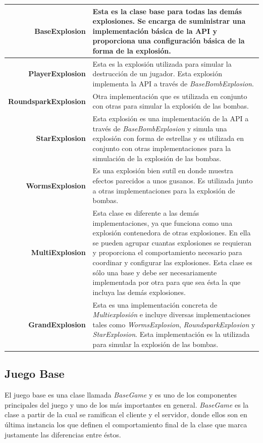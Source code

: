 \documentclass[a4paper,12pt,openany,oneside]{book}
\begin{document}
\begin{center}
\begin{tabular}{|r|p{10cm}|}
\hline
\textbf{BaseExplosion} & Esta es la clase base para todas las demás explosiones. Se encarga de suministrar una implementación básica de la API y proporciona una configuración básica de la forma de la explosión.\\
\hline
\textbf{PlayerExplosion} & Esta es la explosión utilizada para simular la destrucción de un jugador. Esta explosión implementa la API a través de \textit{BaseBombExplosion}. \\
\hline
\textbf{RoundsparkExplosion} & Otra implementación que es utilizada en conjunto con otras para simular la explosión de las bombas. \\
\hline
\textbf{StarExplosion} & Esta explosión es una implementación de la API a través de \textit{BaseBombExplosion} y simula una explosión con forma de estrellas y es utilizada en conjunto con otras implementaciones para la simulación de la explosión de las bombas. \\
\hline
\textbf{WormsExplosion} & Es una explosión bien sutíl en donde muestra efectos parecidos a unos gusanos. Es utilizada junto a otras implementaciones para la explosión de bombas. \\
\hline
\textbf{MultiExplosion} & Esta clase es diferente a las demás implementaciones, ya que funciona como una explosión contenedora de otras explosiones. En ella se pueden agrupar cuantas explosiones se requieran y proporciona el comportamiento necesario para coordinar y configurar las explosiones. Esta clase es sólo una base y debe ser necesariamente implementada por otra para que sea ésta la que incluya las demás explosiones.\\
\hline
\textbf{GrandExplosion} & Esta es una implementación concreta de \textit{Multiexplosión} e incluye diversas implementaciones tales como \textit{WormsExplosion}, \textit{RoundsparkExplosion} y \textit{StarExplosion}. Esta implementación es la utilizada para simular la explosión de las bombas.\\
\hline
\end{tabular}
\end{center}
\subsection{Juego Base}
El juego base es una clase llamada \textit{BaseGame} y es uno de los componentes principales del juego y uno de los más importantes en general. \textit{BaseGame} es la clase a partir de la cual se ramifican el cliente y el servidor, donde ellos son en última instancia los que definen el comportamiento final de la clase que marca justamente las diferencias entre éstos.
\end{document}

